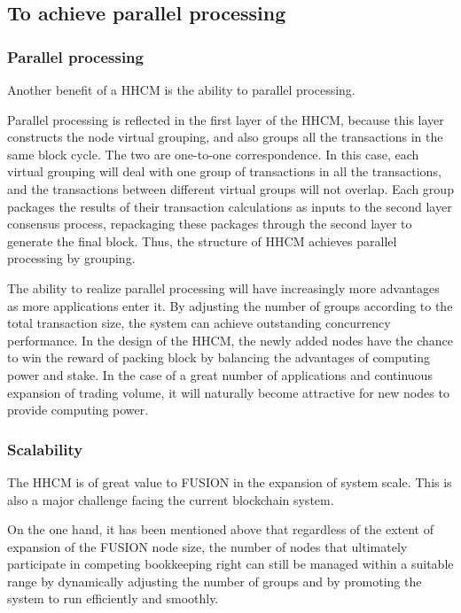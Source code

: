\documentclass[a4paper,12pt]{article}
\begin{document}
\subsection {To achieve parallel processing}

\subsubsection {Parallel processing}

Another benefit of a HHCM is the ability to parallel processing.

Parallel processing is reflected in the first layer of the HHCM, because this layer constructs the node virtual grouping, and also groups all the transactions in the same block cycle. The two are one-to-one correspondence. In this case, each virtual grouping will deal with one group of transactions in all the transactions, and the transactions between different virtual groups will not overlap. Each group packages the results of their transaction calculations as inputs to the second layer consensus process, repackaging these packages through the second layer to generate the final block. Thus, the structure of HHCM achieves parallel processing by grouping.

The ability to realize parallel processing will have increasingly more advantages as more applications enter it. By adjusting the number of groups according to the total transaction size, the system can achieve outstanding concurrency performance. In the design of the HHCM, the newly added nodes have the chance to win the reward of packing block by balancing the advantages of computing power and stake. In the case of a great number of applications and continuous expansion of trading volume, it will naturally become attractive for new nodes to provide computing power.

\subsubsection {Scalability}

The HHCM is of great value to FUSION in the expansion of system scale. This is also a major challenge facing the current blockchain system.

On the one hand, it has been mentioned above that regardless of the extent of expansion of the FUSION node size, the number of nodes that ultimately participate in competing bookkeeping right can still be managed within a suitable range by dynamically adjusting the number of groups and by promoting the system to run efficiently and smoothly.
\end{document}
